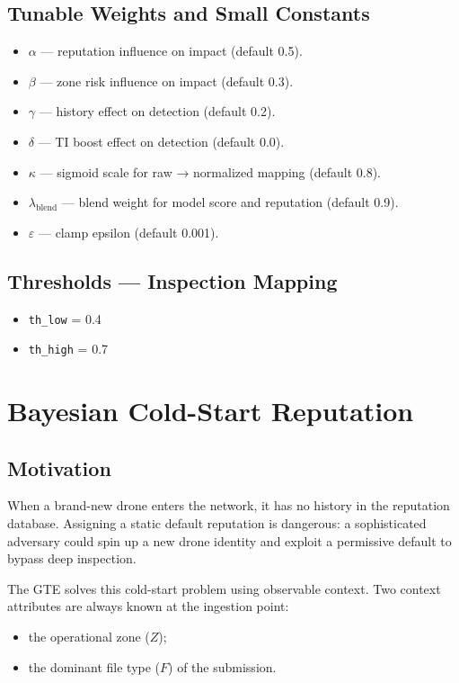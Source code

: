 \documentclass[12pt, a4paper]{report}
\begin{document}
\subsection*{Tunable Weights and Small Constants}

\begin{itemize}
    \item $\alpha$ — reputation influence on impact (default 0.5).
    \item $\beta$ — zone risk influence on impact (default 0.3).
    \item $\gamma$ — history effect on detection (default 0.2).
    \item $\delta$ — TI boost effect on detection (default 0.0).
    \item $\kappa$ — sigmoid scale for raw → normalized mapping (default 0.8).
    \item $\lambda_{\text{blend}}$ — blend weight for model score and reputation (default 0.9).
    \item $\varepsilon$ — clamp epsilon (default 0.001).
\end{itemize}

\subsection*{Thresholds — Inspection Mapping}

\begin{itemize}
    \item \texttt{th\_low} = 0.4
    \item \texttt{th\_high} = 0.7
\end{itemize}


\section{Bayesian Cold-Start Reputation}
\label{sec:gte-bayes}

\subsection{Motivation}

When a brand-new drone enters the network, it has no history in the
reputation database. Assigning a static default reputation is dangerous:
a sophisticated adversary could spin up a new drone identity and exploit
a permissive default to bypass deep inspection.

The GTE solves this cold-start problem using observable context. Two
context attributes are always known at the ingestion point:
\begin{itemize}
    \item the operational zone ($Z$);
    \item the dominant file type ($F$) of the submission.
\end{itemize}
\end{document}
